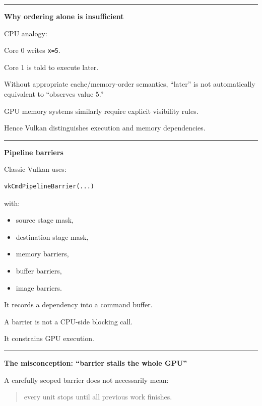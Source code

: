 \begin{center}\rule{0.5\linewidth}{0.5pt}\end{center}

\textbf{Why ordering alone is insufficient}

CPU analogy:

Core 0 writes \texttt{x=5}.

Core 1 is told to execute later.

Without appropriate cache/memory-order semantics, ``later'' is not automatically equivalent to ``observes value 5.''

GPU memory systems similarly require explicit visibility rules.

Hence Vulkan distinguishes execution and memory dependencies.

\begin{center}\rule{0.5\linewidth}{0.5pt}\end{center}

\textbf{Pipeline barriers}

Classic Vulkan uses:

\begin{verbatim}
vkCmdPipelineBarrier(...)
\end{verbatim}

with:

\begin{itemize}
\tightlist
\item
  source stage mask,
\item
  destination stage mask,
\item
  memory barriers,
\item
  buffer barriers,
\item
  image barriers.
\end{itemize}

It records a dependency into a command buffer.

A barrier is not a CPU-side blocking call.

It constrains GPU execution.

\begin{center}\rule{0.5\linewidth}{0.5pt}\end{center}

\textbf{The misconception: ``barrier stalls the whole GPU''}

A carefully scoped barrier does not necessarily mean:

\begin{quote}
every unit stops until all previous work finishes.
\end{quote}

